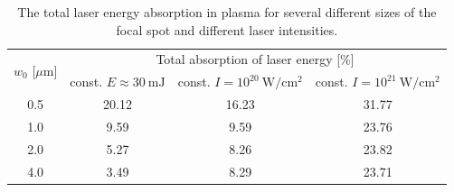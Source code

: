 \begingroup
\renewcommand*{\arraystretch}{1.5}
\begin{table}[b]
	\centering
	\begin{tabular}{c | c | c | c}
		\multirow{2}{*}{$ w_0 $ [$ \mu\mathrm{m} $]} & \multicolumn{3}{c}{Total absorption of laser energy [\%]} \\ \cline{2-4}
		 & const. $ E \approx 30 \ \mathrm{mJ} $ & const. $ I = 10^{20} \ \mathrm{W/cm^2} $ & const. $ I = 10^{21} \ \mathrm{W/cm^2} $ \\ \hline \hline
		0.5 & 20.12 & 16.23 & 31.77 \\ \hline
		1.0 & 9.59 & 9.59 & 23.76 \\ \hline
		2.0 & 5.27 & 8.26 & 23.82 \\ \hline
		4.0 & 3.49 & 8.29 & 23.71 \\
	\end{tabular}
	\caption{The total laser energy absorption in plasma for several different sizes of the focal spot and different laser intensities.}
	\label{table:2}
\end{table}
\endgroup

